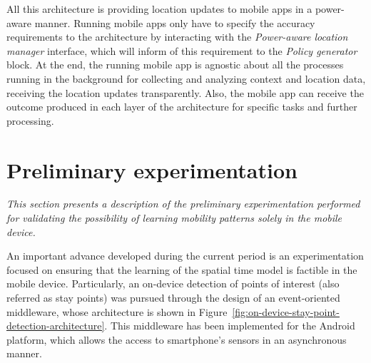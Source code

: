 \documentclass[ENG,PhD]{cinvestav}
\begin{document}
All this architecture is providing location updates to mobile apps in a power-aware manner.
Running mobile apps only have to specify the accuracy requirements to the architecture by interacting with the \emph{Power-aware location manager} interface, which will inform of this requirement to the \emph{Policy generator} block.
At the end, the running mobile app is agnostic about all the processes running in the background for collecting and analyzing context and location data, receiving the location updates transparently.
Also, the mobile app can receive the outcome produced in each layer of the architecture for specific tasks and further processing.


\section{Preliminary experimentation}
\label{sec:preliminary-experimentation}
\emph{This section presents a description of the preliminary experimentation performed for validating the possibility of learning mobility patterns solely in the mobile device.}


An important advance developed during the current period is an experimentation focused on ensuring that the learning of the spatial time model is factible in the mobile device.
Particularly, an on-device detection of points of interest (also referred as stay points) was pursued through the design of an event-oriented middleware, whose architecture is shown in Figure~\ref{fig:on-device-stay-point-detection-architecture}.
This middleware has been implemented for the Android platform, which allows the access to smartphone's sensors in an asynchronous manner.
\end{document}
